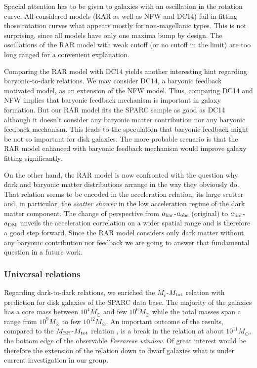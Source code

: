 Spacial attention has to be given to galaxies with an oscillation in the rotation curve. All considered models (RAR as well as NFW and DC14) fail in fitting those rotation curves what appears mostly for non-magellanic types. This is not surprising, since all models have only one maxima bump by design. The oscillations of the RAR model with weak cutoff (or no cutoff in the limit) are too long ranged for a convenient explanation.

Comparing the RAR model with DC14 yields another interesting hint regarding baryonic-to-dark relations. We may consider DC14, a baryonic feedback motivated model, as an extension of the NFW model. Thus, comparing DC14 and NFW implies that baryonic feedback mechanism is important in galaxy formation. But our RAR model fits the SPARC sample as good as DC14 although it doesn't consider any baryonic matter contribution nor any baryonic feedback mechanism. This leads to the speculation that baryonic feedback might be not so important for disk galaxies. The more probable scenario is that the RAR model enhanced with baryonic feedback mechanism would improve galaxy fitting significantly.

On the other hand, the RAR model is now confronted with the question why dark and baryonic matter distributions arrange in the way they obviously do. That relation seems to be encoded in the acceleration relation, its large scatter and, in particular, the \textit{scatter shower} in the low acceleration regime of the dark matter component. The change of perspective from $a_\mathrm{bar}$-$a_\mathrm{obs}$ (original) to $a_\mathrm{bar}$-$a_\mathrm{DM}$ unveils the acceleration correlation on a wider spatial range and is therefore a good step forward. Since the RAR model considers only dark matter without any baryonic contribution nor feedback we are going to answer that fundamental question in a future work.

\subsubsection*{Universal relations}
Regarding dark-to-dark relations, we enriched the $M_c$-$M_{\rm tot}$ relation \citep{RAR-II} with prediction for disk galaxies of the SPARC data base. The majority of the galaxies has a core mass between $10^{4} M_\odot$ and few $10^{6} M_\odot$ while the total masses span a range from $10^{9} M_\odot$ to few $10^{12} M_\odot$. An important outcome of the results, compared to the $M_{\rm BH}$-$M_{\rm tot}$ relation \citep{2002ApJ...578...90F}, is a break in the relation at about $10^{11} M_\odot$, the bottom edge of the observable \textit{Ferrarese window}. Of great interest would be therefore the extension of the relation down to dwarf galaxies what is under current investigation in our group.

